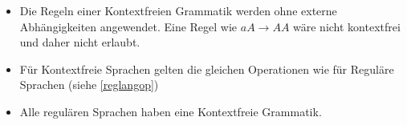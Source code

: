 \documentclass[a4paper]{article}
\begin{document}
\begin{multicols}{2}
	\begin{fmerke}[Kontextfreiheit]
	\begin{itemize}
		\item Die Regeln einer Kontextfreien Grammatik werden ohne externe Abhängigkeiten angewendet. Eine Regel wie $aA \rightarrow AA$ wäre nicht kontextfrei und daher nicht erlaubt. \\
		\item Für Kontextfreie Sprachen gelten die gleichen Operationen wie für Reguläre Sprachen (siehe \ref{reglangop})
		\item Alle regulären Sprachen haben eine Kontextfreie Grammatik.
	\end{itemize}
	\end{fmerke}
	
	\end{multicols}
	
\end{document}
